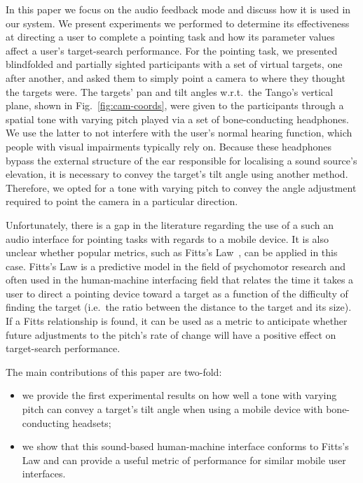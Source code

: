 \documentclass[sigconf, review=true, screen=true, anonymous=true]{acmart}
\begin{document}
In this paper we focus on the audio feedback mode and discuss how it is used in our system. We present experiments we performed to determine its effectiveness at directing a user to complete a pointing task and how its parameter values affect a user's target-search performance. For the pointing task, we presented blindfolded and partially sighted participants with a set of virtual targets, one after another, and asked them to simply point a camera to where they thought the targets were. The targets' pan and tilt angles w.r.t.\ the Tango's vertical plane, shown in Fig.~\ref{fig:cam-coords}, were given to the participants through a spatial tone with varying pitch played via a set of bone-conducting headphones. We use the latter to not interfere with the user's normal hearing function, which people with visual impairments typically rely on. Because these headphones bypass the external structure of the ear responsible for localising a sound source's elevation, it is necessary to convey the target's tilt angle using another method. Therefore, we opted for a tone with varying pitch to convey the angle adjustment required to point the camera in a particular direction.

Unfortunately, there is a gap in the literature regarding the use of a such an audio interface for pointing tasks with regards to a mobile device. It is also unclear whether popular metrics, such as Fitts's Law~\cite{fitts1954information}, can be applied in this case. Fitts's Law is a predictive model in the field of psychomotor research and often used in the human-machine interfacing field that relates the time it takes a user to direct a pointing device toward a target as a function of the difficulty of finding the target (i.e.\ the ratio between the distance to the target and its size). If a Fitts relationship is found, it can be used as a metric to anticipate whether future adjustments to the pitch's rate of change will have a positive effect on target-search performance.

The main contributions of this paper are two-fold: 

\begin{itemize}
  \item we provide the first experimental results on how well a tone with varying pitch can convey a target's tilt angle when using a mobile device with bone-conducting headsets; 
  \item we show that this sound-based human-machine interface conforms to Fitts's Law and can provide a useful metric of performance for similar mobile user interfaces.
\end{itemize}
\end{document}
